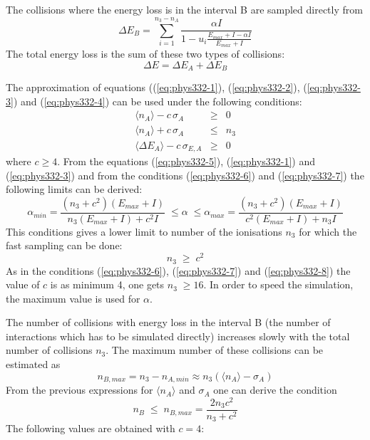 The collisions where the energy loss is in the interval B
are sampled directly from
\begin{equation}
\Delta E_B = \sum_{i=1}^{n_3 - n_A} \frac{\alpha I}
            {1 - u_i \frac{E_{max} + I - \alpha I}{E_{max} + I}}
\end{equation}
The total energy loss is the sum of these two types of
collisions:
\begin{equation}
\Delta E =  \Delta E_A + \Delta E_B
\end{equation}

The approximation of equations ((\ref{eq:phys332-1}),  (\ref{eq:phys332-2}),
 (\ref{eq:phys332-3}) and  (\ref{eq:phys332-4}) can be used under
the following conditions:
\begin{eqnarray}
\label{eq:phys332-6}
\langle n_A \rangle - c \, \sigma_A            & \geq & 0 \\
\label{eq:phys332-7}
\langle n_A \rangle + c \, \sigma_A            & \leq & n_3 \\
\label{eq:phys332-8}
\langle \Delta E_A \rangle - c \, \sigma_{E,A} & \geq & 0
\end{eqnarray}
where $c \geq 4$. From the equations (\ref{eq:phys332-5}),
(\ref{eq:phys332-1}) and (\ref{eq:phys332-3}) and from
the conditions (\ref{eq:phys332-6}) and (\ref{eq:phys332-7})
the following limits can be derived:
\begin{equation}
\alpha_{min} = \frac{ (n_3 + c^2)(E_{max}+I)}
                    {n_3 (E_{max} + I) + c^2 I} \; \leq \alpha \; \leq
\alpha_{max} = \frac{ (n_3 + c^2)(E_{max}+I)}
                    {c^2 (E_{max} + I) + n_3 I}
\end{equation}
This conditions gives a lower limit to number of the ionisations $n_3$
for which the fast sampling can be done:
\begin{equation}
n_3 \; \geq \; c^2
\end{equation}
As in the conditions (\ref{eq:phys332-6}), (\ref{eq:phys332-7})
and (\ref{eq:phys332-8}) the value of $c$ is as minimum 4, one gets
$n_3 \; \geq 16$. In order to speed the simulation, the
maximum value is used for $\alpha$.

The number of collisions with energy loss in the interval B
(the number of interactions which has to be simulated
directly) increases slowly with the total number
of collisions $n_3$. The maximum number of these collisions
can be estimated as
\begin{equation}
n_{B,max} = n_3 - n_{A,min} \approx n_3 (\langle n_A \rangle 
            - \sigma_A)
\end{equation}
From the previous expressions for $\langle n_A \rangle$ and
$\sigma_A$ one can derive the condition
\begin{equation}
n_B \; \leq \; n_{B,max} = \frac{2 n_3 c^2}{n_3+c^2}
\end{equation}
The following values are obtained with $c=4$:

